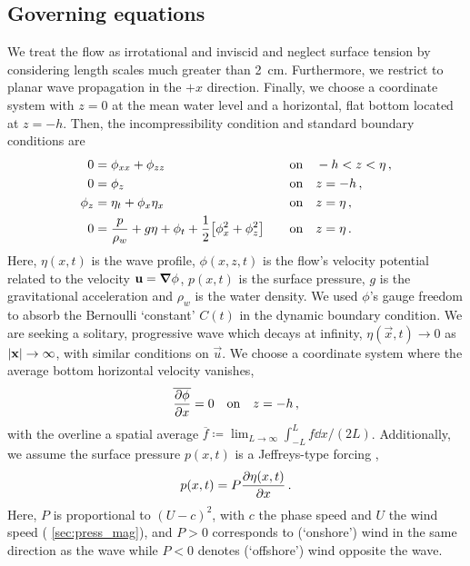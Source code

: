 \documentclass{jfm}
\begin{document}
\subsection{Governing equations}
We treat the flow as irrotational and inviscid and neglect surface
tension by considering length scales much greater than
\SI{2}{\centi\meter}.
Furthermore, we restrict to planar wave propagation in the $+x$
direction.
Finally, we choose a coordinate system with $z=0$ at the mean water
level and a horizontal, flat bottom located at $z=-h$.
Then, the incompressibility condition and standard boundary conditions
are
\begin{alignat}{2}
  0 &= \phi_{xx} + \phi_{zz} &&\qq{on}
  -h < z < \eta \,, \label{eq:laplace}\\
  0 &= \phi_{z} &&\qq{on} z=-h \,, \label{eq:bottom_bc}\\
  \phi_{z} &= \eta_{t} + \phi_{x} \eta_{x} &&\qq{on} z = \eta \,,
  \label{eq:kinematic_bc}\\
  0 &= \frac{p}{\rho_w} + g\eta + \phi_{t} +
  \frac{1}{2} \bqty{\phi_{x}^2 + \phi_{z}^2} &&\qq{on} z=
  \eta \,. \label{eq:dynamic_bc}
\end{alignat}
Here, $\eta(x,t)$ is the wave profile, $\phi(x,z,t)$ is the flow's
velocity potential related to the velocity $\mathbf{\bm{u}} = \grad{\phi}$,
$p(x,t)$ is the surface pressure, $g$ is the gravitational acceleration
and $\rho_w$ is the water density.
We used $\phi$'s gauge freedom to absorb the Bernoulli `constant'
$C(t)$ in the dynamic boundary condition.
We are seeking a solitary, progressive wave which decays at infinity,
$\eta(\vec{x},t) \to 0$ as $\abs{\mathbf{\bm{x}}} \to \infty$, with similar
conditions on $\vec{u}$.
We choose a coordinate system where the average bottom horizontal
velocity vanishes,
\begin{equation}
  \overline{ \pdv{\phi}{x} } = 0 \qq{on} z=-h \,,
  \label{eq:bot_bc_horz}
\end{equation}
with the overline a spatial average $\overline{f} \coloneqq
\lim_{L\to\infty} \int_{-L}^{L} f \dd{x} / (2L)$.
Additionally, we assume the surface pressure $p(x,t)$ is a Jeffreys-type
forcing \citep{jeffreys1925formation},
\begin{equation}
  p(x,t) = P \pdv{\eta(x,t)}{x} \,.
\end{equation}
Here, $P$ is proportional to $(U-c)^2$, with $c$ the phase speed and $U$
the wind speed (\cf{} \cref{sec:press_mag}), and $P>0$ corresponds to
(`onshore') wind in the same direction as the wave while $P<0$ denotes
(`offshore') wind opposite the wave.
\end{document}
